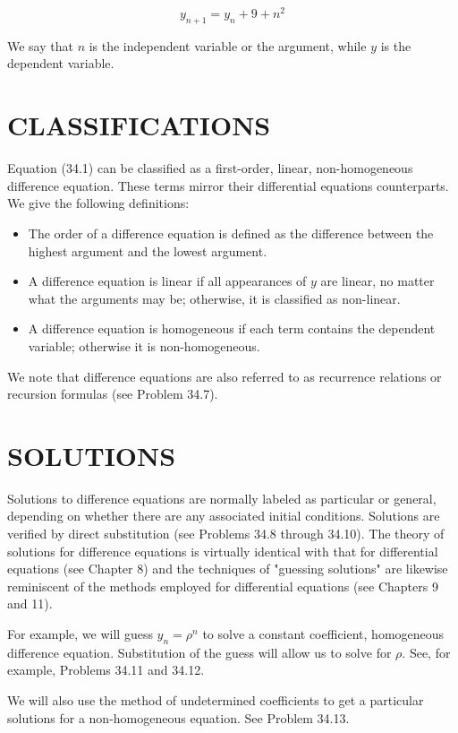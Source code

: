 \documentclass[10pt]{article}
\begin{document}
\begin{equation*}
y_{n+1}=y_{n}+9+n^{2} \tag{34.1}
\end{equation*}


We say that $n$ is the independent variable or the argument, while $y$ is the dependent variable.

\section*{CLASSIFICATIONS}
Equation (34.1) can be classified as a first-order, linear, non-homogeneous difference equation. These terms mirror their differential equations counterparts. We give the following definitions:

\begin{itemize}
  \item The order of a difference equation is defined as the difference between the highest argument and the lowest argument.
  \item A difference equation is linear if all appearances of $y$ are linear, no matter what the arguments may be; otherwise, it is classified as non-linear.
  \item A difference equation is homogeneous if each term contains the dependent variable; otherwise it is non-homogeneous.
\end{itemize}

We note that difference equations are also referred to as recurrence relations or recursion formulas (see Problem 34.7).

\section*{SOLUTIONS}
Solutions to difference equations are normally labeled as particular or general, depending on whether there are any associated initial conditions. Solutions are verified by direct substitution (see Problems 34.8 through 34.10). The theory of solutions for difference equations is virtually identical with that for differential equations (see Chapter 8) and the techniques of "guessing solutions" are likewise reminiscent of the methods employed for differential equations (see Chapters 9 and 11).

For example, we will guess $y_{n}=\rho^{n}$ to solve a constant coefficient, homogeneous difference equation. Substitution of the guess will allow us to solve for $\rho$. See, for example, Problems 34.11 and 34.12.

We will also use the method of undetermined coefficients to get a particular solutions for a non-homogeneous equation. See Problem 34.13.
\end{document}
